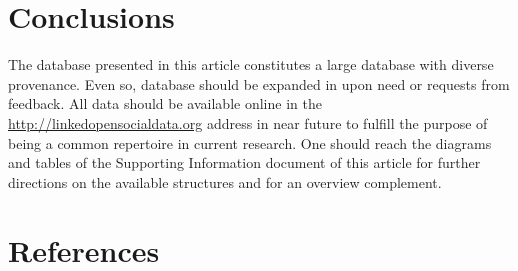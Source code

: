 \documentclass[review]{elsarticle}
\begin{document}
\section{Conclusions}
\label{conclusions}
The database presented in this article
constitutes a large database with diverse provenance.
Even so, database should be expanded in upon need or requests from feedback.
All data should be available online in the \url{http://linkedopensocialdata.org}
address in near future to fulfill the purpose of being a common
repertoire in current research.
One should reach the diagrams and tables of the 
Supporting Information document of this article
for further directions
on the available structures and for an overview complement.

\section*{References}
%
% 

%
%
\end{document}
